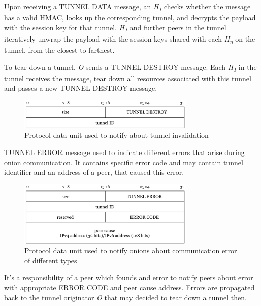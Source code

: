\documentclass{article}
\begin{document}
Upon receiving a TUNNEL DATA message, an \textit{H\textsubscript{1}} checks whether the message has a valid HMAC, looks up the corresponding tunnel, and decrypts the payload with the session key for that tunnel.  \textit{H\textsubscript{1}} and further peers in the tunnel iteratively unwrap the payload with the session keys shared with each \textit{H\textsubscript{n}} on the tunnel, from the closest to farthest.

To tear down a tunnel, \textit{O} sends a TUNNEL DESTROY message. Each \textit{H\textsubscript{1}} in the tunnel receives the message, tear down all resources associated with this tunnel and passes a new TUNNEL DESTROY message.

\begin{figure}[H]
\centering
     \includegraphics[width=0.75\textwidth]{msg_tunnel_destroy.pdf}
      \caption{Protocol data unit used to notify about tunnel invalidation}
\end{figure}

TUNNEL ERROR message used to indicate different errors that arise during onion communication. It contains specific error code and may contain tunnel identifier and an address of a peer, that caused this error.

\begin{figure}[H]
\centering
     \includegraphics[width=0.75\textwidth]{msg_tunnel_error.pdf}
      \caption{Protocol data unit used to notify onions about communication error of different types}
\end{figure}

It's a responsibility of a peer which founds and error to notify peers about error with appropriate ERROR CODE and peer cause address. Errors are propagated back to the tunnel originator \textit{O} that may decided to tear down a tunnel then.

\medskip

\nocite{torproject}
\nocite{netty}


\printbibliography
\end{document}
